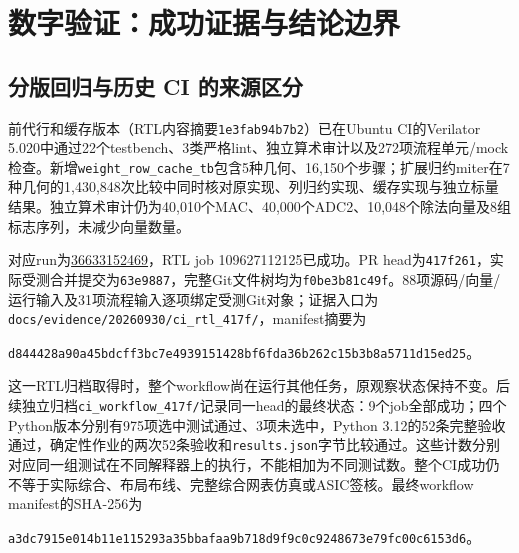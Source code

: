 \documentclass[UTF8,fontset=fandol,11pt,a4paper,openany]{ctexrep}
\newcommand{\code}[1]{\nolinkurl{#1}}
\begin{document}


\chapter{数字验证：成功证据与结论边界}
\section{分版回归与历史 CI 的来源区分}
前代行和缓存版本（RTL内容摘要\code{1e3fab94b7b2}）已在Ubuntu CI的Verilator 5.020中通过22个testbench、3类严格lint、独立算术审计以及272项流程单元/mock检查。新增\code{weight_row_cache_tb}包含5种几何、16,150个步骤；扩展归约miter在7种几何的1,430,848次比较中同时核对原实现、列归约实现、缓存实现与独立标量结果。独立算术审计仍为40,010个MAC、40,000个ADC2、10,048个除法向量及8组标志序列，未减少向量数量。
\par{}对应run为\href{https://github.com/defineiocc02/20bit_SAR_ADC_Behaviour_Verification/actions/runs/36633152469}{36633152469}，RTL job 109627112125已成功。PR head为\code{417f261}，实际受测合并提交为\code{63e9887}，完整Git文件树均为\code{f0be3b81c49f}。88项源码/向量/运行输入及31项流程输入逐项绑定受测Git对象；证据入口为\code{docs/evidence/20260930/ci_rtl_417f/}，manifest摘要为
\par\noindent\code{d844428a90a45bdcff3bc7e4939151428bf6fda36b262c15b3b8a5711d15ed25}。
\par{}这一RTL归档取得时，整个workflow尚在运行其他任务，原观察状态保持不变。后续独立归档\code{ci_workflow_417f/}记录同一head的最终状态：9个job全部成功；四个Python版本分别有975项选中测试通过、3项未选中，Python 3.12的52条完整验收通过，确定性作业的两次52条验收和\code{results.json}字节比较通过。这些计数分别对应同一组测试在不同解释器上的执行，不能相加为不同测试数。整个CI成功仍不等于实际综合、布局布线、完整综合网表仿真或ASIC签核。最终workflow manifest的SHA-256为
\par\noindent\code{a3dc7915e014b11e115293a35bbafaa9b718d9f9c0c9248673e79fc00c6153d6}。
\end{document}
